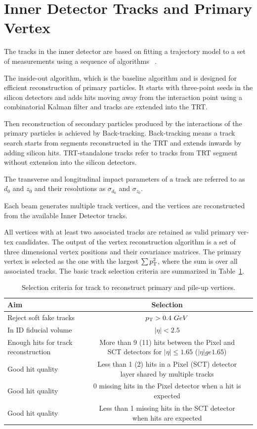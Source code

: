 \section{Inner Detector Tracks and Primary Vertex}
\label{sec:pv}
\par The tracks in the inner detector are based on fitting a trajectory model to a set of measurements using a sequence of algorithms
~\cite{Cornelissen:1020106}.
\par The inside-out algorithm, which is the baseline algorithm and is designed for efficient reconstruction of primary particles. 
It starts with three-point seeds in the silicon detectors and adds hits moving away from the interaction point using a combinatorial Kalman filter 
and tracks are extended into the TRT.
\par Then reconstruction of secondary particles produced by the interactions of the primary particles is achieved by Back-tracking. 
Back-tracking means a track search starts from segments reconstructed in the TRT and extends inwards by adding silicon hits. 
TRT-standalone tracks refer to tracks from TRT segment without extension into the silicon detectors.					
\par The transverse and longitudinal impact parameters of a track are referred to as $d_0$ and $z_0$ and their resolutions as $\sigma_{d_0}$ 
and $\sigma_{z_0}$. 
\par Each beam generates multiple track vertices, and the vertices are reconstructed from the available Inner Detector tracks.
\par All vertices with at least two associated tracks are retained as valid primary ver- tex candidates. 
The output of the vertex reconstruction algorithm is a set of three dimensional vertex positions and their covariance matrices. 
The primary vertex is selected as the one with the largest $\sum p_{\mathrm{T}}^2$, where the sum is over all associated tracks. 
The basic track selection criteria are summarized in Table~\ref{tab:pv}.

\begin{table}[tbh]
\centering
\tiny
\begin{tabular}{|l|c|c}

\hline
 Aim& Selection \\
\hline
Reject soft fake tracks &$p_{\mathrm{T}}> 0.4~GeV$ \\
\hline
In ID fiducial volume &$|\eta| < 2.5$ \\
\hline 
Enough hits for track reconstruction & More than 9 (11) hits between the Pixel and SCT detectors for $|\eta|\le 1.65$ ($|\eta| ge 1.65$)\\
\hline 
 Good hit quality& Less than 1 (2) hits in a Pixel (SCT) detector layer shared by multiple tracks\\
\hline
 Good hit quality&0 missing hits in the Pixel detector when a hit is expected\\
\hline 
Good hit quality&Less than 1 missing hits in the SCT detector when hits are expected\\
 \hline
\end{tabular}
\caption{Selection criteria for track to reconstruct primary and pile-up vertices.}
\label{tab:pv}

\end{table}


